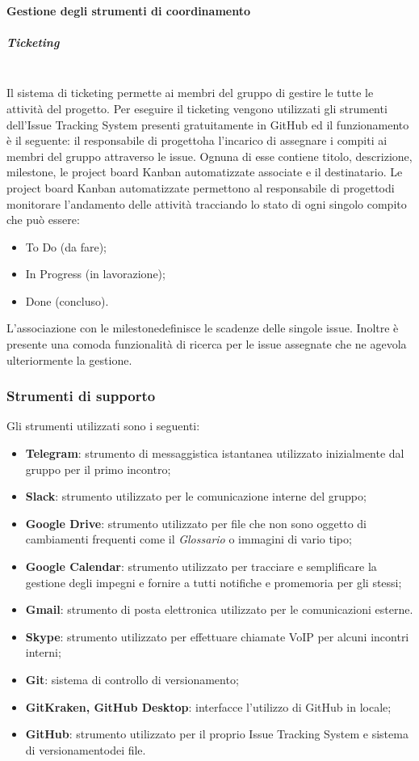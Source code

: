 		\paragraph{Gestione degli strumenti di coordinamento}
			\subparagraph{Ticketing}\mbox{}\\ [1mm]
				Il sistema di ticketing permette ai membri del gruppo di gestire le tutte le attività del progetto\glo.
				Per eseguire il ticketing vengono utilizzati gli strumenti dell'Issue Tracking System presenti gratuitamente in GitHub ed il funzionamento è il seguente:
				il responsabile di progetto\glosp ha l'incarico di assegnare i compiti ai membri del gruppo attraverso le issue. Ognuna di esse contiene titolo, descrizione, milestone\glo, le project board Kanban automatizzate associate e il destinatario.
				Le project board Kanban automatizzate permettono al responsabile di progetto\glosp di monitorare l'andamento delle attività tracciando lo stato di ogni singolo compito che può essere:
				\begin{itemize}
					\item To Do (da fare);
					\item In Progress (in lavorazione);
					\item Done (concluso).
				\end{itemize}
				L'associazione con le milestone\glosp definisce le scadenze delle singole issue.
				Inoltre è presente una comoda funzionalità di ricerca per le issue assegnate che ne agevola ulteriormente la gestione.
		\subsubsection{Strumenti di supporto}
			Gli strumenti utilizzati sono i seguenti:
			\begin{itemize}
				\item \textbf{Telegram}: strumento di messaggistica istantanea utilizzato inizialmente dal gruppo per il primo incontro;
				\item \textbf{Slack}: strumento utilizzato per le comunicazione interne del gruppo;
				\item \textbf{Google Drive}: strumento utilizzato per file che non sono oggetto di cambiamenti frequenti come il \textit{Glossario} o immagini di vario tipo;
				\item \textbf{Google Calendar}: strumento utilizzato per tracciare e semplificare la gestione degli impegni e fornire a tutti notifiche e promemoria per gli stessi;
				\item \textbf{Gmail}: strumento di posta elettronica utilizzato per le comunicazioni esterne.
				\item \textbf{Skype}: strumento utilizzato per effettuare chiamate VoIP per alcuni incontri interni;
				\item \textbf{Git}: sistema di controllo di versionamento\glo;
				\item \textbf{GitKraken, GitHub Desktop}: interfacce l'utilizzo di GitHub in locale;
				\item \textbf{GitHub}: strumento utilizzato per il proprio Issue Tracking System e sistema di versionamento\glosp dei file.
			\end{itemize}
